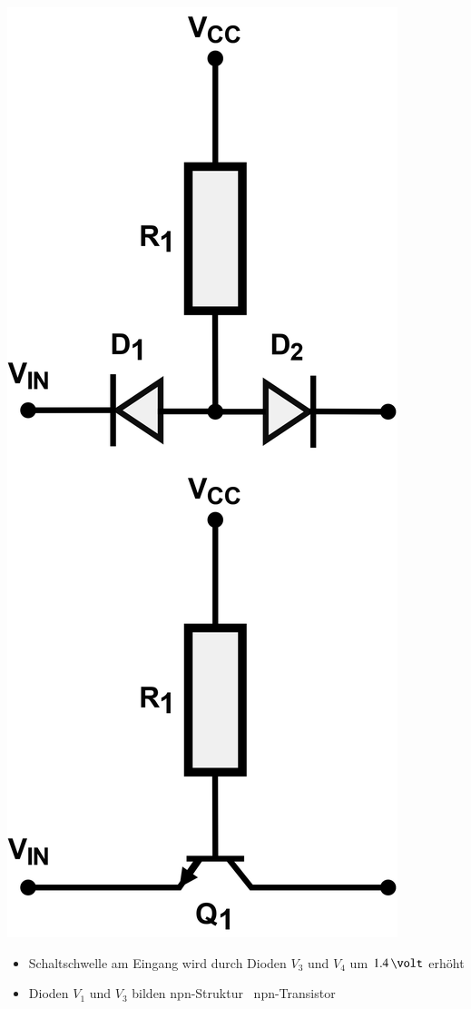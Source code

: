 \begin{minipage}[c]{0.11\columnwidth}
    \includegraphics[width=\columnwidth]{images/dtl_diodes_transistor.png}
\end{minipage}
\hfill
\begin{minipage}[c]{0.48\columnwidth}
    \begin{itemize}
        \item  Schaltschwelle am Eingang wird durch Dioden $V_3$ und $V_4$ um $1.4 \, \volt$ erhöht
        \item Dioden $V_1$ und $V_3$ bilden npn-Struktur \textrightarrow\ npn-Transistor
    \end{itemize}
\end{minipage}

